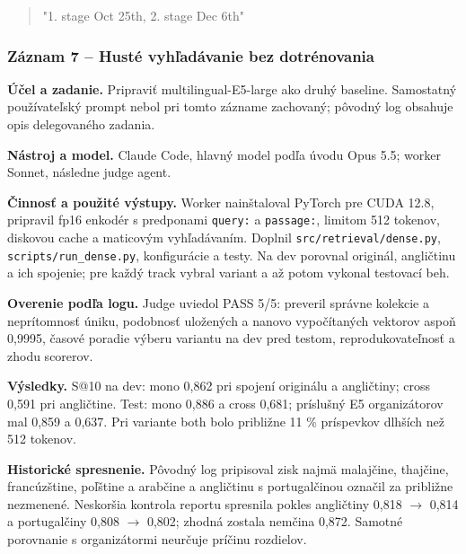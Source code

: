 \begin{quote}\normalsize "1. stage Oct 25th, 2. stage Dec 6th"\end{quote}

\subsubsection*{Záznam 7 -- Husté vyhľadávanie bez dotrénovania}


\par\noindent \textbf{Účel a zadanie.} Pripraviť multilingual-E5-large ako druhý baseline. Samostatný používateľský prompt nebol pri tomto zázname zachovaný; pôvodný log obsahuje opis delegovaného zadania.\par\smallskip
\par\noindent \textbf{Nástroj a model.} Claude Code, hlavný model podľa úvodu Opus 5.5; worker Sonnet, následne judge agent.\par\smallskip
\par\noindent \textbf{Činnosť a použité výstupy.} Worker nainštaloval PyTorch pre CUDA 12.8, pripravil fp16 enkodér s predponami \texttt{query:} a \texttt{passage:}, limitom 512 tokenov, diskovou cache a maticovým vyhľadávaním. Doplnil \texttt{src/\allowbreak{}retrieval/\allowbreak{}dense.\allowbreak{}py}, \texttt{scripts/\allowbreak{}run\_\allowbreak{}dense.\allowbreak{}py}, konfigurácie a testy. Na dev porovnal originál, angličtinu a ich spojenie; pre každý track vybral variant a až potom vykonal testovací beh.\par\smallskip
\par\noindent \textbf{Overenie podľa logu.} Judge uviedol PASS 5/5: preveril správne kolekcie a neprítomnosť úniku, podobnosť uložených a nanovo vypočítaných vektorov aspoň 0,9995, časové poradie výberu variantu na dev pred testom, reprodukovateľnosť a zhodu scorerov.\par\smallskip
\par\noindent \textbf{Výsledky.} S@10 na dev: mono 0,862 pri spojení originálu a angličtiny; cross 0,591 pri angličtine. Test: mono 0,886 a cross 0,681; príslušný E5 organizátorov mal 0,859 a 0,637. Pri variante both bolo približne 11 \% príspevkov dlhších než 512 tokenov.\par\smallskip
\par\noindent \textbf{Historické spresnenie.} Pôvodný log pripisoval zisk najmä malajčine, thajčine, francúzštine, poľštine a arabčine a angličtinu s portugalčinou označil za približne nezmenené. Neskoršia kontrola reportu spresnila pokles angličtiny 0,818 $\to$ 0,814 a portugalčiny 0,808 $\to$ 0,802; zhodná zostala nemčina 0,872. Samotné porovnanie s organizátormi neurčuje príčinu rozdielov.\par\smallskip

